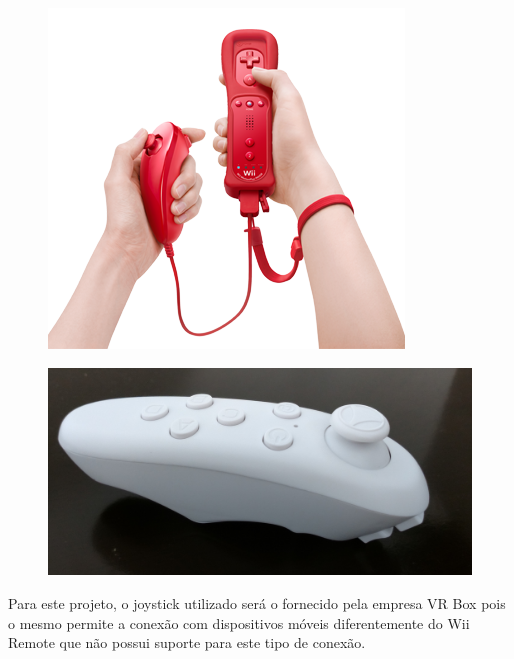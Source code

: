 \begin{figure}[H]
	
	\begin{minipage}{.5\textwidth}{
			\centering
			\includegraphics[width=.7\linewidth]{Imagens/wiiremote.png}		
			\label{f.wiiremote}	
		}
	\end{minipage}
	\begin{minipage}{.5\textwidth}{
			\centering
			\includegraphics[width=.7\linewidth]{Imagens/controlevrbox.jpg}		
			\label{f.controlevrbox}
		}
	\end{minipage}
	
\end{figure}

Para este projeto, o joystick utilizado será o fornecido pela empresa VR Box pois o mesmo permite a conexão com dispositivos móveis diferentemente do Wii Remote que não possui suporte para este tipo de conexão. 	